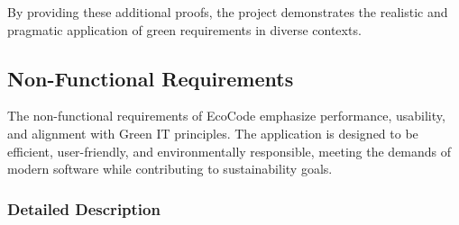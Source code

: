 \documentclass[conference,compsoc]{IEEEtran}
\begin{document}
By providing these additional proofs, the project demonstrates the realistic and pragmatic application of green requirements in diverse contexts.


\subsection{Non-Functional Requirements}
The non-functional requirements of EcoCode emphasize performance, usability, and alignment with Green IT principles. The application is designed to be efficient, user-friendly, and environmentally responsible, meeting the demands of modern software while contributing to sustainability goals.

\subsubsection{Detailed Description}
\end{document}
